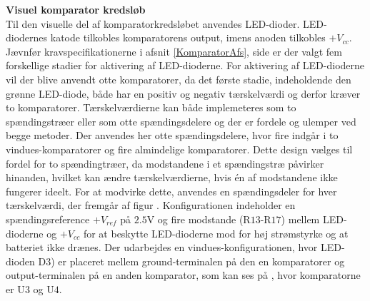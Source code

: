 \noindent\textbf{Visuel komparator kredsløb} \\
Til den visuelle del af komparatorkredsløbet anvendes LED-dioder. LED-diodernes katode tilkobles komparatorens output, imens anoden tilkobles $+V_{cc}$. Jævnfør kravspecifikationerne i afsnit \ref{KomparatorAfs}, side \pageref{KomparatorAfs} er der valgt fem forskellige stadier for aktivering af LED-dioderne. For aktivering af LED-dioderne vil der blive anvendt otte komparatorer, da det første stadie, indeholdende den grønne LED-diode, både har en positiv og negativ tærskelværdi og derfor kræver to komparatorer. Tærskelværdierne kan både implemeteres som to spændingstræer eller som otte spændingsdelere og der er fordele og ulemper ved begge metoder. Der anvendes her otte spændingsdelere, hvor fire indgår i to vindues-komparatorer og fire almindelige komparatorer. Dette design vælges til fordel for to spændingtræer, da modstandene i et spændingstræ påvirker hinanden, hvilket kan ændre tærskelværdierne, hvis én af modstandene ikke fungerer ideelt. For at modvirke dette, anvendes en spændingsdeler for hver tærskelværdi, der fremgår af figur . Konfigurationen indeholder en spændingsreference $+V_{ref}$ på $2.5$V og fire modstande (R$13$-R$17$) mellem LED-dioderne og $+V_{cc}$ for at beskytte LED-dioderne mod for høj strømstyrke og at batteriet ikke drænes. Der udarbejdes en vindues-konfigurationen, hvor LED-dioden D$3$) er placeret mellem ground-terminalen på den en komparatorer og output-terminalen på en anden komparator, som kan ses på , hvor komparatorne er U$3$ og U$4$. 
